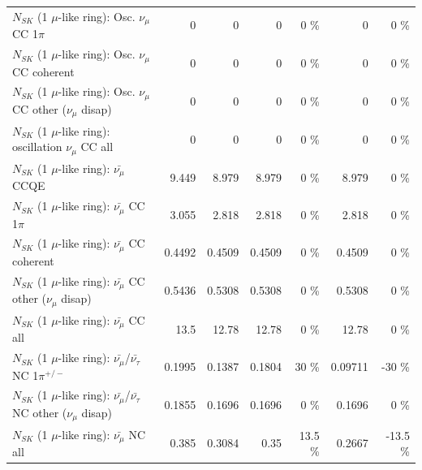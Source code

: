 \begin{table}
\begin{tabular}{| l | r | r | r  r | r  r |}
                          $N_{SK}$ (1 $\mu$-like ring): Osc. $\nu_\mu$ CC 1$\pi$ &               0 &               0 &               0 &        0 \%  &               0 &        0 \%  \\ 
                        $N_{SK}$ (1 $\mu$-like ring): Osc. $\nu_\mu$ CC coherent &               0 &               0 &               0 &        0 \%  &               0 &        0 \%  \\ 
         $N_{SK}$ (1 $\mu$-like ring): Osc. $\nu_\mu$ CC other ($\nu_\mu$ disap) &               0 &               0 &               0 &        0 \%  &               0 &        0 \%  \\ 
                      $N_{SK}$ (1 $\mu$-like ring): oscillation $\nu_\mu$ CC all &               0 &               0 &               0 &        0 \%  &               0 &        0 \%  \\ 
\hline
\hline
                              $N_{SK}$ (1 $\mu$-like ring): $\bar{\nu_\mu}$ CCQE &           9.449 &           8.979 &           8.979 &        0 \%  &           8.979 &        0 \%  \\ 
                         $N_{SK}$ (1 $\mu$-like ring): $\bar{\nu_\mu}$ CC 1$\pi$ &           3.055 &           2.818 &           2.818 &        0 \%  &           2.818 &        0 \%  \\ 
                       $N_{SK}$ (1 $\mu$-like ring): $\bar{\nu_\mu}$ CC coherent &          0.4492 &          0.4509 &          0.4509 &        0 \%  &          0.4509 &        0 \%  \\ 
        $N_{SK}$ (1 $\mu$-like ring): $\bar{\nu_\mu}$ CC other ($\nu_\mu$ disap) &          0.5436 &          0.5308 &          0.5308 &        0 \%  &          0.5308 &        0 \%  \\ 
                          $N_{SK}$ (1 $\mu$-like ring): $\bar{\nu_{\mu}}$ CC all &            13.5 &           12.78 &           12.78 &        0 \%  &           12.78 &        0 \%  \\ 
\hline
  $N_{SK}$ (1 $\mu$-like ring): $\bar{\nu_\mu}$/$\bar{\nu_\tau}$ NC 1$\pi^{+/-}$ &          0.1995 &          0.1387 &          0.1804 &       30 \%  &         0.09711 &      -30 \%  \\ 
$N_{SK}$ (1 $\mu$-like ring): $\bar{\nu_\mu}$/$\bar{\nu_\tau}$ NC other ($\nu_\mu$ disap) &          0.1855 &          0.1696 &          0.1696 &        0 \%  &          0.1696 &        0 \%  \\ 
                          $N_{SK}$ (1 $\mu$-like ring): $\bar{\nu_{\mu}}$ NC all &           0.385 &          0.3084 &            0.35 &     13.5 \%  &          0.2667 &    -13.5 \%  \\ 

\end{tabular}
\end{table}
